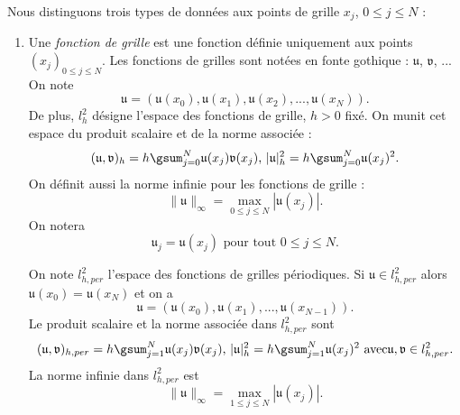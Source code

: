 Nous distinguons trois types de données aux points de grille $x_j$, $0 \leq j \leq N$ :
\begin{enumerate}
\item Une \textit{fonction de grille} est une fonction définie uniquement aux points $(x_j)_{0 \leq j \leq N}$. Les fonctions de grilles sont notées en fonte gothique : $\mathfrak{u}$, $\mathfrak{v}$, ... 
On note
\begin{equation}
\mathfrak{u} = (\mathfrak{u}(x_0), \mathfrak{u}(x_1), \mathfrak{u}(x_2), ... , \mathfrak{u}(x_N)).
\end{equation}
De plus, $l^2_h$ désigne l'espace des fonctions de grille, $h>0$ fixé.
On munit cet espace du produit scalaire et de la norme associée :
\begin{equation}
(\mathfrak{u},\mathfrak{v})_h = h \gsum_{j=0}^N \mathfrak{u}(x_j) \mathfrak{v}(x_j) \text{,  } |\mathfrak{u}|_h^2 = h \gsum_{j=0}^N \mathfrak{u}(x_j)^2.
\end{equation}
On définit aussi la norme infinie pour les fonctions de grille :
\begin{equation}
\| \mathfrak{u} \|_{\infty} = \max_{0\leq j \leq N} |\mathfrak{u}(x_j)|.
\end{equation}
On notera 
\begin{equation}
\mathfrak{u}_j = \mathfrak{u}(x_j) \text{ pour tout } 0\leq j \leq N.  
\end{equation}

On note $l^2_{h,per}$ l'espace des fonctions de grilles périodiques. Si $\mathfrak{u} \in l^2_{h,per}$ alors $\mathfrak{u}(x_0) = \mathfrak{u}(x_N)$ et on a
\begin{equation}
\mathfrak{u}=(\mathfrak{u}(x_0), \mathfrak{u}(x_1), ..., \mathfrak{u}(x_{N-1})).
\end{equation}
Le produit scalaire et la norme associée dans $l^2_{h,per}$ sont
\begin{equation}
(\mathfrak{u},\mathfrak{v})_{h,per} = h \gsum_{j=1}^N \mathfrak{u}(x_j) \mathfrak{v}(x_j) \text{,  } |\mathfrak{u}|_h^2 = h \gsum_{j=1}^N \mathfrak{u}(x_j)^2 \text{ avec} \mathfrak{u}, \mathfrak{v} \in l^2_{h,per}.
\end{equation}
La norme infinie dans $l^2_{h,per}$ est
\begin{equation}
\| \mathfrak{u} \|_{\infty} = \max_{1\leq j \leq N} |\mathfrak{u}(x_j)|.
\end{equation}




\end{enumerate}
